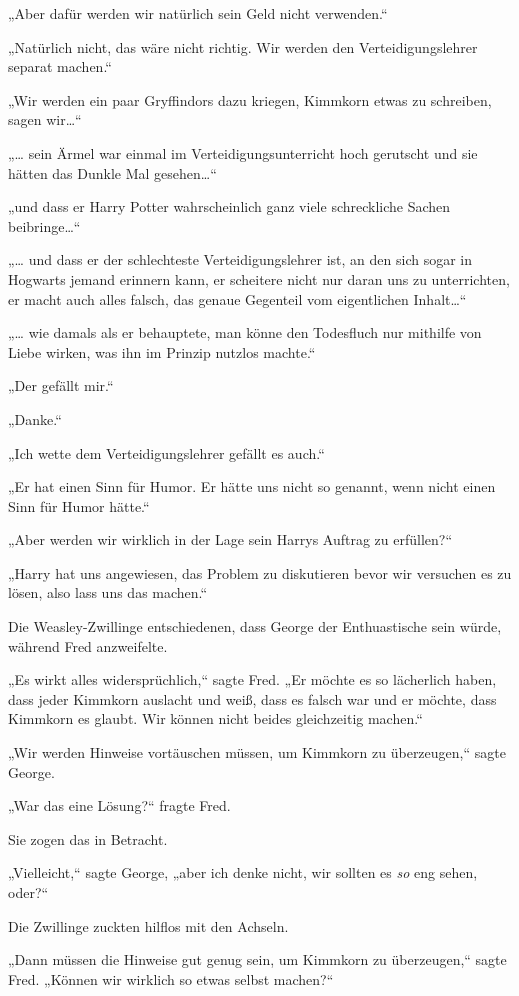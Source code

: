 {„Aber dafür werden wir natürlich sein Geld nicht verwenden.“

„Natürlich nicht, das wäre nicht richtig. Wir werden den Verteidigungslehrer separat machen.“

„Wir werden ein paar Gryffindors dazu kriegen, Kimmkorn etwas zu schreiben, sagen wir…“

„… sein Ärmel war einmal im Verteidigungsunterricht hoch gerutscht und sie hätten das Dunkle Mal gesehen…“

„und dass er Harry Potter wahrscheinlich ganz viele schreckliche Sachen beibringe…“

„… und dass er der schlechteste Verteidigungslehrer ist, an den sich sogar in Hogwarts jemand erinnern kann, er scheitere nicht nur daran uns zu unterrichten, er macht auch alles falsch, das genaue Gegenteil vom eigentlichen Inhalt…“

„… wie damals als er behauptete, man könne den Todesfluch nur mithilfe von Liebe wirken, was ihn im Prinzip nutzlos machte.“

„Der gefällt mir.“

„Danke.“

„Ich wette dem Verteidigungslehrer gefällt es auch.“

„Er hat einen Sinn für Humor. Er hätte uns nicht so genannt, wenn nicht einen Sinn für Humor hätte.“

„Aber werden wir wirklich in der Lage sein Harrys Auftrag zu erfüllen?“

„Harry hat uns angewiesen, das Problem zu diskutieren bevor wir versuchen es zu lösen, also lass uns das machen.“

Die Weasley-Zwillinge entschiedenen, dass George der Enthuastische sein würde, während Fred anzweifelte.

„Es wirkt alles widersprüchlich,“ sagte Fred. „Er möchte es so lächerlich haben, dass jeder Kimmkorn auslacht und weiß, dass es falsch war und er möchte, dass Kimmkorn es glaubt. Wir können nicht beides gleichzeitig machen.“

„Wir werden Hinweise vortäuschen müssen, um Kimmkorn zu überzeugen,“ sagte George.

„War das eine Lösung?“ fragte Fred.

Sie zogen das in Betracht.

„Vielleicht,“ sagte George, „aber ich denke nicht, wir sollten es \emph{so} eng sehen, oder?“

Die Zwillinge zuckten hilflos mit den Achseln.

„Dann müssen die Hinweise gut genug sein, um Kimmkorn zu überzeugen,“ sagte Fred. „Können wir wirklich so etwas selbst machen?“

}
